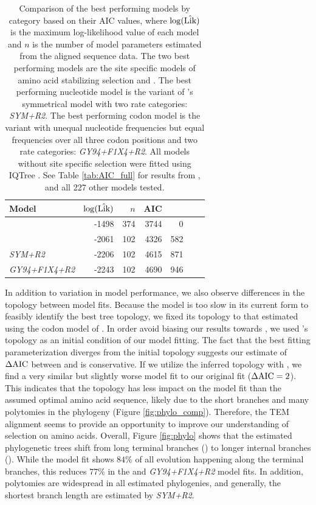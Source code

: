 \documentclass[fleqn,letterpaper]{article}
\begin{document}
\begin{table}
  \centering
  \caption{Comparison of the best performing models by category based on their AIC values, where  $\log(\hat{\text{Lik}})$ is the maximum log-likelihood value of each model and $n$ is the number of model parameters estimated from the aligned sequence data.
    The two best performing models are the site specific models of amino acid stabilizing selection \selac and \phydms.
    The best performing nucleotide model is the variant of \citet{zharkikh1994}'s symmetrical model with two rate categories: \emph{SYM+R2}. 
    The best performing codon model is the \gy variant with unequal nucleotide frequencies but equal frequencies over all three codon positions and two rate categories: \emph{GY94+F1X4+R2}.
    All models without site specific selection were fitted using IQTree \citep{nguyen2015}.
  See Table \ref{tab:AIC_full} for results from \selac, \phydms and all 227 other models tested.
}  
  \begin{tabular}{lrrrrrr}
    \hline
    Model							& $\log(\hat{\text{Lik}})$ & $n$ & AIC & \DeltaAIC \\ \hline 
    \selac							& -1498 & 374 & 3744 &  0 \\
    \phydms 						& -2061 & 102 & 4326 & 582 \\
    \emph{SYM+R2} 				& -2206 & 102 & 4615 & 871 \\
    \emph{GY94+F1X4+R2} 		& -2243 & 102 & 4690 & 946 \\ \hline
  \end{tabular}
  \label{tab:AIC_selac}
\end{table}


In addition to variation in model performance, we also observe differences in the topology between model fits.
Because the \selac model is too slow in its current form to feasibly identify the best tree topology, we fixed its topology to that estimated using the codon model of \citet{KosiolEtAl07}.
In order avoid biasing our results towards \selac, we used \selac's topology as an initial condition of our \phydms model fitting.
The fact that the best fitting \phydms parameterization diverges from the initial topology suggests our estimate of $\Delta\text{AIC}$ between \selac and \phydms is conservative.
If we utilize the \phydms inferred topology with \selac, we find a very similar but slightly worse model fit to our original \selac fit ($\Delta\text{AIC} = 2$).
This indicates that the topology has less impact on the model fit than the assumed optimal amino acid sequence, likely due to the short branches and many polytomies in the phylogeny (Figure \ref{fig:phylo_comp}).
Therefore, the TEM alignment seems to provide an opportunity to improve our understanding of selection on amino acids.
Overall, Figure \ref{fig:phylo} shows that the estimated phylogenetic trees shift from long terminal branches (\selac) to longer internal branches (\phydms).
While the \selac model fit shows $84 \%$ of all evolution happening along the terminal branches, this reduces $77 \%$ in the \phydms and \emph{GY94+F1X4+R2} model fits.
In addition, polytomies are widespread in all estimated phylogenies, and generally, the shortest branch length are estimated by \emph{SYM+R2}.
\end{document}
